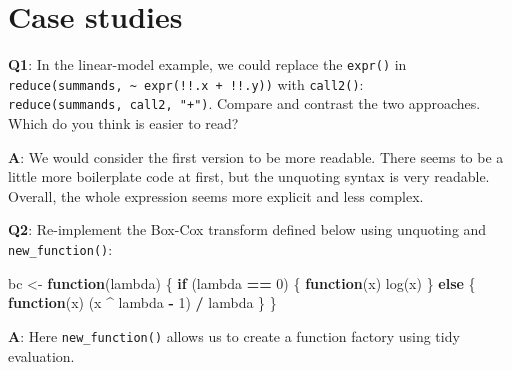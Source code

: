 \documentclass[
]{krantz}
\makeatletter
\newenvironment{Shaded}{\begin{snugshade}}{\end{snugshade}}
\newcommand{\ControlFlowTok}[1]{\textcolor[rgb]{0.13,0.29,0.53}{\textbf{#1}}}
\newcommand{\DecValTok}[1]{\textcolor[rgb]{0.00,0.00,0.81}{#1}}
\newcommand{\KeywordTok}[1]{\textcolor[rgb]{0.13,0.29,0.53}{\textbf{#1}}}
\newcommand{\NormalTok}[1]{#1}
\newcommand{\OperatorTok}[1]{\textcolor[rgb]{0.81,0.36,0.00}{\textbf{#1}}}
\newcommand{\StringTok}[1]{\textcolor[rgb]{0.31,0.60,0.02}{#1}}
\newenvironment{kframe}{%
\medskip{}
\setlength{\fboxsep}{.8em}
 \def\at@end@of@kframe{}%
 \ifinner\ifhmode%
  \def\at@end@of@kframe{\end{minipage}}%
  \begin{minipage}{\columnwidth}%
 \fi\fi%
 \def\FrameCommand##1{\hskip\@totalleftmargin \hskip-\fboxsep
 \colorbox{shadecolor}{##1}\hskip-\fboxsep
     \hskip-\linewidth \hskip-\@totalleftmargin \hskip\columnwidth}%
 \MakeFramed {\advance\hsize-\width
   \@totalleftmargin\z@ \linewidth\hsize
   \@setminipage}}%
 {\par\unskip\endMakeFramed%
 \at@end@of@kframe}
\renewenvironment{Shaded}{\begin{kframe}}{\end{kframe}}
\renewcommand{\KeywordTok} [1]{\textcolor[rgb]{0.00,0.44,0.13}{{#1}}}
\renewcommand{\DecValTok}  [1]{\textcolor[rgb]{0.25,0.63,0.44}{{#1}}}
\renewcommand{\StringTok}  [1]{\textcolor[rgb]{0.25,0.44,0.63}{{#1}}}
\renewcommand{\NormalTok}  [1]{{#1}}
\makeatother
\begin{document}
\hypertarget{expr-case-studies}{%
\section{Case studies}\label{expr-case-studies}}

\textbf{{Q1}}: In the linear-model example, we could replace the \texttt{expr()} in \texttt{reduce(summands,\ \textasciitilde{}\ expr(!!.x\ +\ !!.y))} with \texttt{call2()}: \texttt{reduce(summands,\ call2,\ "+")}. Compare and contrast the two approaches. Which do you think is easier to read?

\textbf{{A}}: We would consider the first version to be more readable. There seems to be a little more boilerplate code at first, but the unquoting syntax is very readable. Overall, the whole expression seems more explicit and less complex.

\textbf{{Q2}}: Re-implement the Box-Cox transform defined below using unquoting and \texttt{new\_function()}:

\begin{Shaded}
\begin{Highlighting}[]
\NormalTok{bc <-}\StringTok{ }\ControlFlowTok{function}\NormalTok{(lambda) \{}
  \ControlFlowTok{if}\NormalTok{ (lambda }\OperatorTok{==}\StringTok{ }\DecValTok{0}\NormalTok{) \{}
    \ControlFlowTok{function}\NormalTok{(x) }\KeywordTok{log}\NormalTok{(x)}
\NormalTok{  \} }\ControlFlowTok{else}\NormalTok{ \{}
    \ControlFlowTok{function}\NormalTok{(x) (x }\OperatorTok{^}\StringTok{ }\NormalTok{lambda }\OperatorTok{-}\StringTok{ }\DecValTok{1}\NormalTok{) }\OperatorTok{/}\StringTok{ }\NormalTok{lambda}
\NormalTok{  \}}
\NormalTok{\}}
\end{Highlighting}
\end{Shaded}

\textbf{{A}}: Here \texttt{new\_function()} allows us to create a function factory using tidy evaluation.
\end{document}
